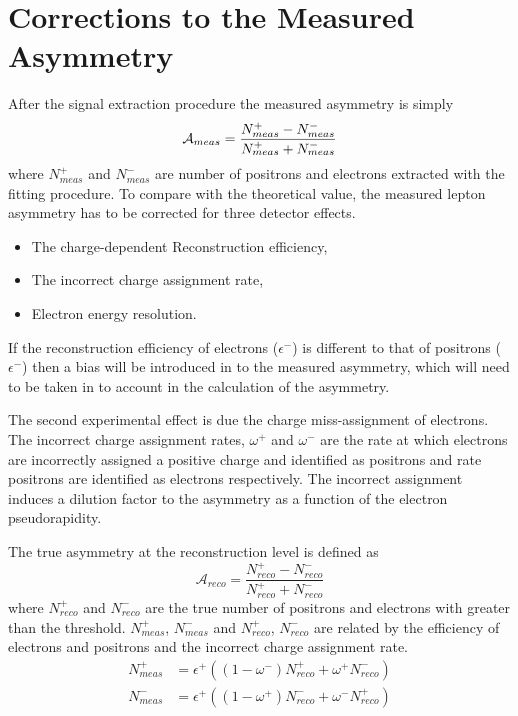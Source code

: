 \section{Corrections to the Measured Asymmetry}
After the signal extraction procedure the measured asymmetry is simply 
\begin{equation}
\mathcal{A}_{meas} = \frac{
\label{eq:meas}
  N_{meas}^{+} -
  N_{meas}^{-}
}
{
  N_{meas}^{+} +
  N_{meas}^{-}
}
\end{equation}
where $N_{meas}^{+}$ and $N_{meas}^{-}$ are number of positrons and
electrons extracted with the fitting procedure.
To compare with the theoretical value, the measured lepton asymmetry has to be
corrected for three detector effects.
\begin{itemize}
\item The charge-dependent Reconstruction efficiency,
\item The incorrect charge assignment rate,
\item Electron energy resolution.
\end{itemize}

If the reconstruction efficiency of electrons ($\epsilon^-$) is different to
that of positrons ($\epsilon^-$) then a bias will be introduced in to the
measured asymmetry, which will need to be taken in to account in the calculation
of the asymmetry.  

The second experimental effect is due the charge miss-assignment of electrons.
The incorrect charge assignment rates, $\omega^+$ and $\omega^-$ are the rate at which electrons are
incorrectly assigned a positive charge and identified as positrons and rate positrons are
identified as electrons respectively.
The incorrect assignment induces a dilution factor to the asymmetry as a
function of the electron pseudorapidity. 

The true asymmetry at the reconstruction level is defined as
\begin{equation}
\label{eq:reco}
\mathcal{A}_{reco} = \frac{
  N_{reco}^{+} -
  N_{reco}^{-}
}
{
  N_{reco}^{+} +
  N_{reco}^{-}
}
\end{equation}
where $N_{reco}^{+}$ and $N_{reco}^{-}$ are the true number of positrons and
electrons with \pT greater than the threshold. 
$N_{meas}^{+}$, $N_{meas}^{-}$ and 
$N_{reco}^{+}$, $N_{reco}^{-}$ are related by the efficiency of electrons and
positrons and the incorrect charge assignment rate.
\begin{align}
  \label{eq:poscor}
  N_{meas}^{+} 
  &= \epsilon^+ \left( ( 1 - \omega^- ) N_{reco}^{+} + \omega^+ N_{reco}^{-} \right)\\
  \label{eq:negcor}
  N_{meas}^{-} 
  &= \epsilon^+ \left( ( 1 - \omega^+ ) N_{reco}^{-} + \omega^- N_{reco}^{+} \right)
\end{align}


